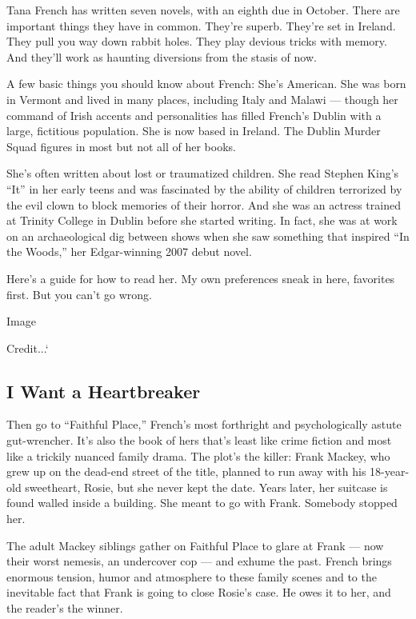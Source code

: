 Tana French has written seven novels, with an eighth due in October.
There are important things they have in common. They're superb. They're
set in Ireland. They pull you way down rabbit holes. They play devious
tricks with memory. And they'll work as haunting diversions from the
stasis of now.

A few basic things you should know about French: She's American. She was
born in Vermont and lived in many places, including Italy and Malawi ---
though her command of Irish accents and personalities has filled
French's Dublin with a large, fictitious population. She is now based in
Ireland. The Dublin Murder Squad figures in most but not all of her
books.

She's often written about lost or traumatized children. She read Stephen
King's ``It'' in her early teens and was fascinated by the ability of
children terrorized by the evil clown to block memories of their horror.
And she was an actress trained at Trinity College in Dublin before she
started writing. In fact, she was at work on an archaeological dig
between shows when she saw something that inspired ``In the Woods,'' her
Edgar-winning 2007 debut novel.

Here's a guide for how to read her. My own preferences sneak in here,
favorites first. But you can't go wrong.

Image

Credit...`

\hypertarget{i-want-a-heartbreaker}{%
\subsection{I Want a Heartbreaker}\label{i-want-a-heartbreaker}}

Then go to ``Faithful Place,'' French's most forthright and
psychologically astute gut-wrencher. It's also the book of hers that's
least like crime fiction and most like a trickily nuanced family drama.
The plot's the killer: Frank Mackey, who grew up on the dead-end street
of the title, planned to run away with his 18-year-old sweetheart,
Rosie, but she never kept the date. Years later, her suitcase is found
walled inside a building. She meant to go with Frank. Somebody stopped
her.

The adult Mackey siblings gather on Faithful Place to glare at Frank ---
now their worst nemesis, an undercover cop --- and exhume the past.
French brings enormous tension, humor and atmosphere to these family
scenes and to the inevitable fact that Frank is going to close Rosie's
case. He owes it to her, and the reader's the winner.

